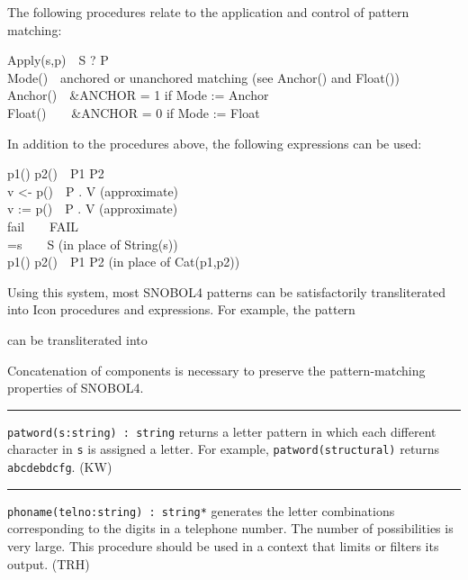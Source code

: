 The following procedures relate to the application and control of
pattern matching:

Apply(s,p)\ \ S ? P\\
Mode()\ \ anchored or unanchored matching (see Anchor() and
Float())\\
Anchor()\ \ \&ANCHOR = 1 if Mode := Anchor\\
Float()\ \ \ \ \&ANCHOR = 0 if Mode := Float

In addition to the procedures above, the following expressions can be
used:

p1() {\textbar} p2()\ \ P1 {\textbar} P2\\
v {\textless}- p()\ \ P . V (approximate)\\
v := p()\ \ P . V (approximate)\\
fail\ \ \ \ FAIL\\
=s\ \ \ \ S (in place of String(s))\\
p1() {\textbar}{\textbar} p2()\ \ P1 P2 (in place of Cat(p1,p2))

Using this system, most SNOBOL4 patterns can be satisfactorily
transliterated into Icon procedures and expressions. For example, the
pattern


can be transliterated into


Concatenation of components is necessary to preserve the
pattern-matching properties of SNOBOL4. 

\vspace{0.25cm}\hrule{}

\texttt{patword(s:string) : string} returns a letter pattern in which
each different character in \texttt{s} is assigned a letter. For
example, \texttt{patword({\textquotedbl}structural{\textquotedbl})}
returns \texttt{{\textquotedbl}abcdebdcfg{\textquotedbl}}. (KW)

\vspace{0.25cm}\hrule{}

\texttt{phoname(telno:string) : string*} generates the letter
combinations corresponding to the digits in a telephone number. The
number of possibilities is very large. This procedure should be used in
a context that limits or filters its output. (TRH)

